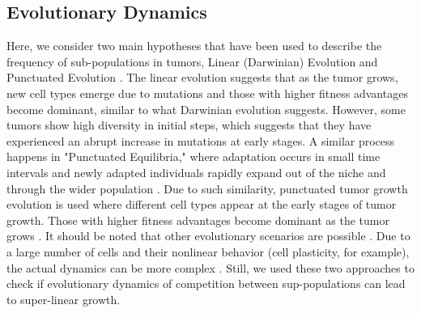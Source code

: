 \documentclass[aps,prl, superscriptaddress,groupedaddress]{revtex4}  %
\begin{document}
	\subsection{Evolutionary Dynamics}
	Here, we consider two main hypotheses that have been used to describe the frequency of sub-populations in tumors,  Linear (Darwinian) Evolution and Punctuated Evolution \cite{wang2014tumor, davis2017tumor, turajlic2019resolving, williams2020measuring}.  The linear evolution suggests that as the tumor grows, new cell types emerge due to mutations and those with higher fitness advantages become dominant, similar to what Darwinian evolution suggests. However, some tumors show high diversity in initial steps, which suggests that they have experienced an abrupt increase in mutations at early stages. A similar process happens in "Punctuated Equilibria," where adaptation occurs in small time intervals and newly adapted individuals rapidly expand out of the niche and through the wider population \cite{gould1972punctuated}. Due to such similarity, punctuated tumor growth evolution is used where different cell types appear at the early stages of tumor growth. Those with higher fitness advantages become dominant as the tumor grows \cite{turajlic2019resolving}. It should be noted that other evolutionary scenarios are possible \cite{davis2017tumor}. Due to a large number of cells and their nonlinear behavior (cell plasticity, for example), the actual dynamics can be more complex \cite{turajlic2019resolving}. Still, we used these two approaches to check if evolutionary dynamics of competition between sup-populations can lead to super-linear growth. 
	
\end{document}
